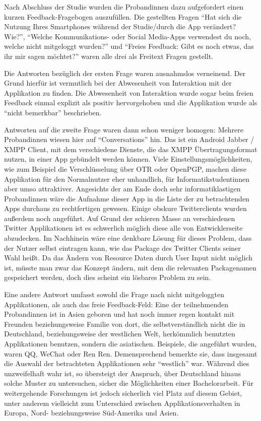 Nach Abschluss der Studie wurden die Probandinnen dazu aufgefordert einen kurzen Feedback-Fragebogen auszufüllen.
Die gestellten Fragen "`Hat sich die Nutzung Ihres Smartphones während der Studie/durch die App verändert? Wie?"', "`Welche Kommunikations- oder Social Media-Apps verwendest du noch, welche nicht mitgeloggt wurden?"' und "`Freies Feedback: Gibt es noch etwas, das ihr mir sagen möchtet?"' waren alle drei als Freitext Fragen gestellt.
\par
Die Antworten bezüglich der ersten Frage waren ausnahmslos verneinend.
Der Grund hierfür ist vermutlich bei der Abwesenheit von Interaktion mit der Applikation zu finden.
Die Abwesenheit von Interaktion wurde sogar beim freien Feedback einmal explizit als positiv hervorgehoben und die Applikation wurde als "`nicht bemerkbar"' beschrieben.
\par
Antworten auf die zweite Frage waren dann schon weniger homogen:
Mehrere Probandinnen wiesen hier auf "`Conversations"' hin. 
Das ist ein Android Jabber / XMPP Client, mit dem verschiedene Dienste, die das XMPP Übertragungsformat nutzen, in einer App gebündelt werden können.
Viele Einstellungsmöglichkeiten, wie zum Beispiel die Verschlüsselung über OTR oder OpenPGP, machen diese Applikation für den Normalnutzer eher unhandlich, für Informatikstudentinnen aber umso attraktiver.
Angesichts der am Ende doch sehr informatiklastigen Probandinnen wäre die Aufnahme dieser App in die Liste der zu betrachtenden Apps durchaus zu rechtfertigen gewesen.
Einige obskure Twitterclients wurden außerdem noch angeführt.
Auf Grund der schieren Masse an verschiedenen Twitter Applikationen ist es schwerlich möglich diese alle von Entwicklerseite abzudecken. 
Im Nachhinein wäre eine denkbare Lösung für dieses Problem, dass der Nutzer selbst eintragen kann, wie das Package des Twitter Clients seiner Wahl heißt.
Da das Ändern von Resource Daten durch User Input nicht möglich ist, müsste man zwar das Konzept ändern, mit dem die relevanten Packagenamen gespeichert werden, doch dies scheint ein lösbares Problem zu sein.
\par
Eine andere Antwort umfasst sowohl die Frage nach nicht mitgeloggten Applikationen, als auch das freie Feedback-Feld:
Eine der teilnehmenden Probandinnen ist in Asien geboren und hat noch immer regen kontakt mit Freunden beziehungsweise Familie von dort, 
die selbstverständlich nicht die in Deutschland, beziehungsweise der westlichen Welt, herkömmlich benutzten Applikationen benutzen, sondern die asiatischen.
Beispiele, die angeführt wurden, waren QQ, WeChat oder Ren Ren.
Demensprechend bemerkte sie, dass insgesamt die Auswahl der betrachteten Applikationen sehr "`westlich"' war.
Während dies unzweifelhaft wahr ist, so übersteigt der Anspruch, über Deutschland hinaus solche Muster zu untersuchen, sicher die Möglichkeiten einer Bachelorarbeit.
Für weitergehende Forschungen ist jedoch sicherlich viel Platz auf diesem Gebiet, unter anderem vielleicht zum Unterschied zwischen Applikationsverhalten in Europa, Nord- beziehungsweise Süd-Amerika und Asien. 
\par

